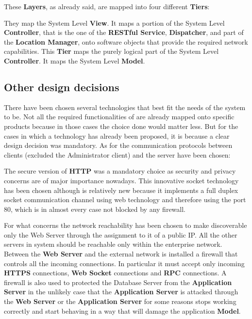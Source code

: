 These \textbf{Layers}, as already said, are mapped into four different \textbf{Tiers}:
\begin{itemize}
	 They map the System Level \textbf{View}.
	 It maps a portion of the System Level \textbf{Controller}, that is the one of the \textbf{RESTful Service}, \textbf{Dispatcher}, and part of the \textbf{Location Manager}, onto software objects that provide the required network capabilities.
	 This \textbf{Tier} maps the purely logical part of the System Level \textbf{Controller}.
	 It maps the System Level \textbf{Model}.
\end{itemize}

\subsection{Other design decisions}
There have been chosen several technologies that best fit the needs of the system to be. Not all the required functionalities of \myTaxiService{} are already mapped onto specific products because in those cases the choice done would matter less.
But for the cases in which a technology has already been proposed, it is because a clear design decision was mandatory.
As for the communication protocols between clients (excluded the Administrator client) and the server have been chosen:
\begin{itemize}
	 The secure version of \textbf{HTTP} was a mandatory choice as security and privacy concerns are of major importance nowadays.
	 This innovative socket technology has been chosen although is relatively new because it implements a full duplex socket communication channel using web technology and therefore using the port 80, which is in almost every case not blocked by any firewall.
\end{itemize}
For what concerns the network reachability has been chosen to make discoverable only the Web Server through the assignment to it of a public IP.
All the other servers in \myTaxiService{} system should be reachable only within the enterprise network.
Between the \textbf{Web Server} and the external network is installed a firewall that controls all the incoming connections.
In particular it must accept only incoming \textbf{HTTPS} connections, \textbf{Web Socket} connections and \textbf{RPC} connections.
A firewall is also used to protected the Database Server from the \textbf{Application Server} in the unlikely case that the \textbf{Application Server} is attacked through the \textbf{Web Server} or the \textbf{Application Server} for some reasons stops working correctly and start behaving in a way that will damage the application \textbf{Model}.
